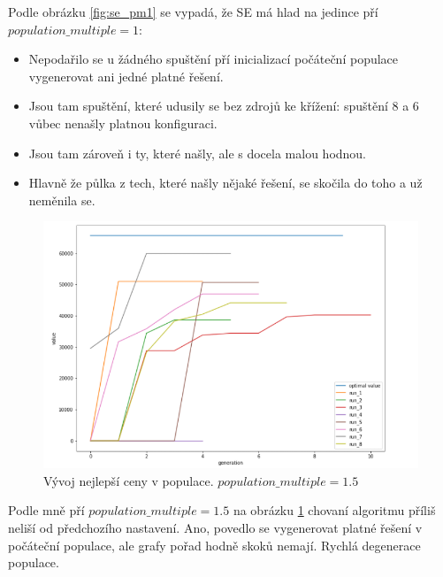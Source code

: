 \documentclass{article}
\begin{document}
Podle obrázku \ref{fig:se_pm1} se vypadá, že SE má hlad na jedince pří \(population\_multiple =1\):
\begin{itemize}
\item Nepodařilo se u žádného spuštění pří inicializací počáteční populace vygenerovat ani jedné platné řešení.
\item Jsou tam spuštění, které udusily se bez zdrojů ke křížení: spuštění 8 a 6 vůbec nenašly platnou konfiguraci.
\item Jsou tam zároveň i ty, které našly, ale s docela malou hodnou.
\item Hlavně že půlka z tech, které našly nějaké řešení, se skočila do toho a už neměnila se.
\end{itemize}

\begin{figure}[H]
    \centering
    \includegraphics[width=1\textwidth]{screenshot_1281}
    \caption{Vývoj nejlepší ceny v populace. \(population\_multiple = 1.5\)}
    \label{fig:se_pm15}
\end{figure}

Podle mně pří \(population\_multiple=1.5\) na obrázku \ref{fig:se_pm15} chovaní algoritmu příliš neliší od předchozího nastavení. Ano, povedlo se vygenerovat platné řešení v počáteční populace, ale grafy pořad hodně skoků nemají. Rychlá degenerace populace.
\end{document}
